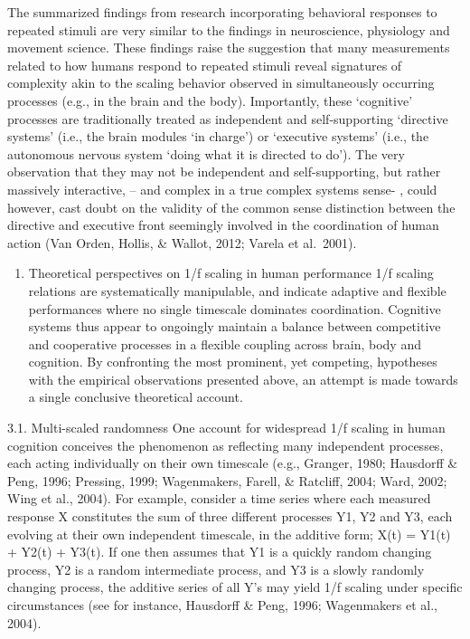 \documentclass[12pt,]{book}
\providecommand{\tightlist}{%
  \setlength{\itemsep}{0pt}\setlength{\parskip}{0pt}}
\begin{document}
The summarized findings from research incorporating behavioral responses to repeated stimuli are very similar to the findings in neuroscience, physiology and movement science. These findings raise the suggestion that many measurements related to how humans respond to repeated stimuli reveal signatures of complexity akin to the scaling behavior observed in simultaneously occurring processes (e.g., in the brain and the body). Importantly, these `cognitive' processes are traditionally treated as independent and self-supporting `directive systems' (i.e., the brain modules `in charge') or `executive systems' (i.e., the autonomous nervous system `doing what it is directed to do'). The very observation that they may not be independent and self-supporting, but rather massively interactive, -- and complex in a true complex systems sense- , could however, cast doubt on the validity of the common sense distinction between the directive and executive front seemingly involved in the coordination of human action (Van Orden, Hollis, \& Wallot, 2012; Varela et al.~2001).

\begin{enumerate}
\def\labelenumi{\arabic{enumi}.}
\setcounter{enumi}{2}
\tightlist
\item
  Theoretical perspectives on 1/f scaling in human performance
  1/f scaling relations are systematically manipulable, and indicate adaptive and flexible performances where no single timescale dominates coordination. Cognitive systems thus appear to ongoingly maintain a balance between competitive and cooperative processes in a flexible coupling across brain, body and cognition. By confronting the most prominent, yet competing, hypotheses with the empirical observations presented above, an attempt is made towards a single conclusive theoretical account.
\end{enumerate}

3.1. Multi-scaled randomness
One account for widespread 1/f scaling in human cognition conceives the phenomenon as reflecting many independent processes, each acting individually on their own timescale (e.g., Granger, 1980; Hausdorff \& Peng, 1996; Pressing, 1999; Wagenmakers, Farell, \& Ratcliff, 2004; Ward, 2002; Wing et al., 2004). For example, consider a time series where each measured response X constitutes the sum of three different processes Y1, Y2 and Y3, each evolving at their own independent timescale, in the additive form; X(t) = Y1(t) + Y2(t) + Y3(t). If one then assumes that Y1 is a quickly random changing process, Y2 is a random intermediate process, and Y3 is a slowly randomly changing process, the additive series of all Y's may yield 1/f scaling under specific circumstances (see for instance, Hausdorff \& Peng, 1996; Wagenmakers et al., 2004).
\end{document}
